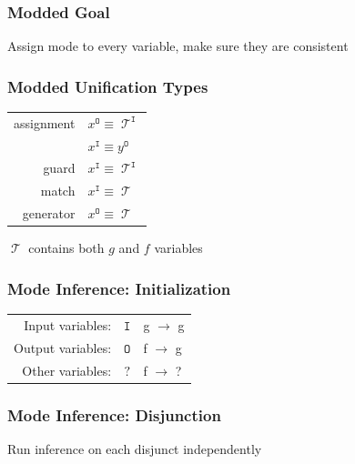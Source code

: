 \documentclass[xcolor=table, aspectratio=169]{beamer}
\DeclareMathOperator{\Term}{\mathcal{T}}
\DeclareMathOperator{\inmode}{\mathtt{I}}
\DeclareMathOperator{\outmode}{\mathtt{O}}
\begin{document}
\begin{frame}[fragile]
  \frametitle{Modded Goal}
  \begin{center}
Assign mode to every variable, make sure they are consistent
  \end{center}
\end{frame}

\begin{frame}[fragile]
  \frametitle{Modded Unification Types}

\begin{center}
\begin{tabular}{rl}
  assignment & $x^{\outmode} \equiv \Term^{\inmode} $ \\
             & $x^{\inmode}  \equiv y^{\outmode}    $ \\
  guard      & $x^{\inmode}  \equiv \Term^{\inmode} $ \\
  match      & $x^{\inmode}  \equiv \Term           $ \\
  generator  & $x^{\outmode} \equiv \Term           $
\end{tabular}
\end{center}

\hfill \footnotesize $\Term$ contains both $g$ and $f$ variables
\end{frame}

\begin{frame}[fragile]
  \frametitle{Mode Inference: Initialization }


\begin{center}
\begin{tabular}{rcl}
  Input variables:  & $\mathtt{I}$ & g $\rightarrow$ g \\
  Output variables: & $\mathtt{O}$ & f $\rightarrow$ g \\
  Other variables:  & $\mathtt{?}$ & f $\rightarrow$ ?
\end{tabular}
\end{center}

\vfill


\end{frame}

\begin{frame}[fragile]
  \frametitle{Mode Inference: Disjunction }

\begin{center}
Run inference on each disjunct independently
\end{center}

\begin{columns}
  \begin{column}[t]{0.15\textwidth}
  \end{column}
  \begin{column}[t]{0.34\textwidth}
    
  \end{column}
  \begin{column}[t]{0.34\textwidth}
    
  \end{column}
  \begin{column}[t]{0.15\textwidth}
  \end{column}
\end{columns}
\end{frame}
\end{document}
